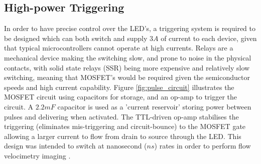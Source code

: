 \documentclass[fleqn,twoside,12pt]{report}
\begin{document}
\subsection{High-power Triggering}
 

In order to have precise control over the LED's, a triggering system is required to be designed which can both switch and supply $3A$ of current to each device, given that typical microcontrollers cannot operate at high currents. Relays are a mechanical device making the switching slow, and prone to noise in the physical contacts, with solid state relays (SSR) being more expensive and relatively slow switching, meaning that MOSFET's would be required given the semiconductor speeds and high current capability. Figure \ref{fig:pulse_circuit} illustrates the MOSFET circuit using capacitors for storage, and an op-amp to trigger the circuit. A $2.2mF$ capacitor is used as a 'current reservoir' storing power between pulses and delivering when activated. The TTL-driven op-amp stabilises the triggering (eliminates mis-triggering and circuit-bounce) to the MOSFET gate allowing a larger current to flow from drain to source through the LED. This design was intended to switch at nanosecond ($ns$) rates in order to perform flow velocimetry imaging \cite{willert}. 
\end{document}
